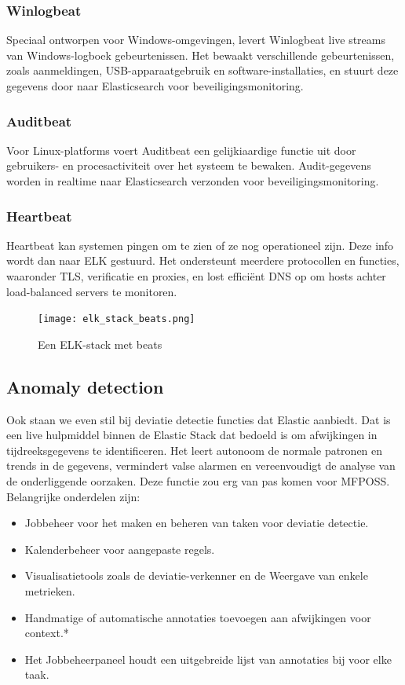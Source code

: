 \subsubsection{Winlogbeat}
Speciaal ontworpen voor Windows-omgevingen, levert Winlogbeat live streams van Windows-logboek gebeurtenissen. Het bewaakt verschillende gebeurtenissen, zoals aanmeldingen, USB-apparaatgebruik en software-installaties, en stuurt deze gegevens door naar Elasticsearch voor beveiligingsmonitoring.

\subsubsection{Auditbeat}
Voor Linux-platforms voert Auditbeat een gelijkiaardige functie uit door gebruikers- en procesactiviteit over het systeem te bewaken. Audit-gegevens worden in realtime naar Elasticsearch verzonden voor beveiligingsmonitoring.

\subsubsection{Heartbeat}
Heartbeat kan systemen pingen om te zien of ze nog operationeel zijn. Deze info wordt dan naar ELK gestuurd. Het ondersteunt meerdere protocollen en functies, waaronder TLS, verificatie en proxies, en lost efficiënt DNS op om hosts achter load-balanced servers te monitoren.


\begin{figure}[h]
    \centering
    \texttt{[image: elk\_stack\_beats.png]}
    \caption{Een ELK-stack met beats ~\autocite{DavidTaylor}}
    \label{fig:Een ELK-stack met beats}
\end{figure}

\subsection{Anomaly detection}
Ook staan we even stil bij deviatie detectie functies dat Elastic aanbiedt. Dat is een live hulpmiddel binnen de Elastic Stack dat bedoeld is om afwijkingen in tijdreeksgegevens te identificeren. Het leert autonoom de normale patronen en trends in de gegevens, vermindert valse alarmen en vereenvoudigt de analyse van de onderliggende oorzaken. Deze functie zou erg van pas komen voor MFPOSS. Belangrijke onderdelen zijn:
\begin{itemize}
    \item Jobbeheer voor het maken en beheren van taken voor deviatie detectie.
    \item Kalenderbeheer voor aangepaste regels.
    \item Visualisatietools zoals de deviatie-verkenner en de Weergave van enkele metrieken.
    \item Handmatige of automatische annotaties toevoegen aan afwijkingen voor context.*
    \item Het Jobbeheerpaneel houdt een uitgebreide lijst van annotaties bij voor elke taak.
\end{itemize}


